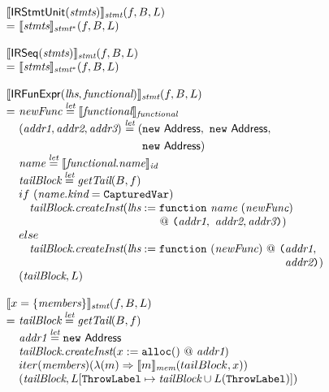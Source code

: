 \[
\begin{array}{l@{}l@{~}l}
\lefteqn{\transfun{\irstmtunit{\emph{stmts}}}_{\emph{stmt}}(f, B, L)}\\
 & = &
\transfun{\emph{stmts}}_{\emph{stmt}^{*}}(f, B, L)\\
& & \\

\lefteqn{\transfun{\irseq{\emph{stmts}}}_{\emph{stmt}}(f, B, L)}\\
 & = &
\transfun{\emph{stmts}}_{\emph{stmt}^{*}}(f, B, L)\\
& & \\

\lefteqn{\transfun{\SF{IRFunExpr}(\emph{lhs}, \emph{functional})}_{\emph{stmt}}(f, B, L)}\\
& = & \emph{newFunc} \letval \transfun{\emph{functional}}_{\emph{functional}}\\
& & (\emph{addr1}, \emph{addr2}, \emph{addr3}) \letval (\new\ \Address,\ \new\ \Address,\\
& & \phantom{(\emph{addr1}, \emph{addr2}, \emph{addr3}) \letval (}\new\ \Address)\\
& & \emph{name} \letval \transfun{\emph{functional}.\emph{name}}_{\emph{id}}\\
& & \emph{tailBlock} \letval \getTail(B, f)\\
& & if\ (\emph{name}.\emph{kind} = \TT{CapturedVar}) \\
& & \phantom{if} \emph{tailBlock}.\emph{createInst}(\emph{lhs} := \TT{function}\ \emph{name}\ (\emph{newFunc}) \\
& & \phantom{if \emph{tailBlock}.\emph{createInst}(\emph{lhs} :=}
~@~ \TT{(}\emph{addr1},\ \emph{addr2}, \emph{addr3}\TT{)})\\
& & else\\
& & \phantom{if} \emph{tailBlock}.\emph{createInst}(\emph{lhs} := \TT{function}\ (\emph{newFunc}) ~@~
\TT{(} \emph{addr1},\\
& & \phantom{if \emph{tailBlock}.\emph{createInst}(\emph{lhs} := \TT{function}\ (\emph{newFunc}) ~@~ \TT{(}}\emph{addr2}\TT{)})\\
& & (\emph{tailBlock}, L)\\
& & \\

\lefteqn{\transfun{\irobject{x}{\emph{members}}}_{\emph{stmt}}(f, B, L)}\\
& = & \emph{tailBlock} \letval \getTail(B, f)\\
& & \emph{addr1} \letval \new\ \Address\\
& & \emph{tailBlock}.\emph{createInst}(x := \TT{alloc}() ~@~ \emph{addr1})\\
& & iter(\emph{members})(\lambda(m) \Rightarrow \transfun{m}_{\emph{mem}}(tailBlock, x))\\
& & (\emph{tailBlock}, L[\ThrowLabel \mapsto \emph{tailBlock} \cup L(\ThrowLabel)])\\
& & \\


\end{array}\]
